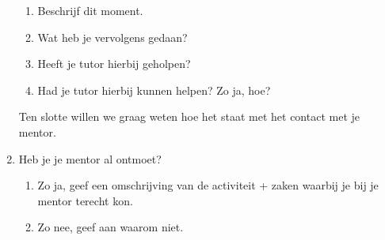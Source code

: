 \begin{enumerate}
\begin{enumerate}
		\item Beschrijf dit moment.

		\item Wat heb je vervolgens gedaan?

		\item Heeft je tutor hierbij geholpen?

		\item Had je tutor hierbij kunnen helpen?
                  Zo ja, hoe?

	\end{enumerate}

Ten slotte willen we graag weten hoe het staat met het contact met je mentor.
	\item Heb je je mentor al ontmoet?

		\begin{enumerate}

			\item Zo ja, geef een omschrijving van de activiteit + zaken waarbij je bij je mentor terecht kon.

			\item Zo nee, geef aan waarom niet.

		\end{enumerate}

\end{enumerate}

